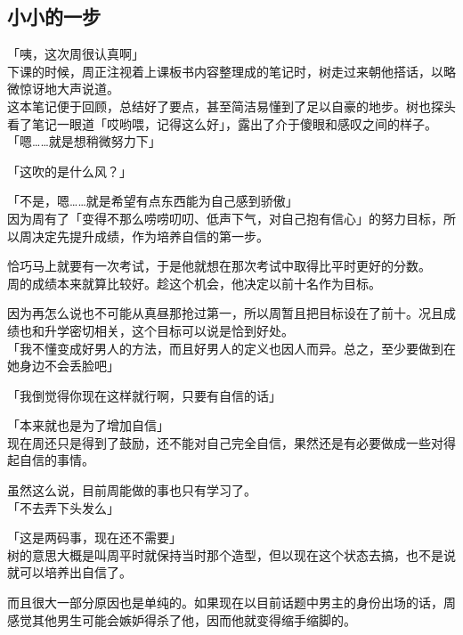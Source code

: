 \subsection{小小的一步}

「咦，这次周很认真啊」\\

下课的时候，周正注视着上课板书内容整理成的笔记时，树走过来朝他搭话，以略微惊讶地大声说道。\\

这本笔记便于回顾，总结好了要点，甚至简洁易懂到了足以自豪的地步。树也探头看了笔记一眼道「哎哟喂，记得这么好」，露出了介于傻眼和感叹之间的样子。\\

「嗯……就是想稍微努力下」

「这吹的是什么风？」

「不是，嗯……就是希望有点东西能为自己感到骄傲」\\

因为周有了「变得不那么唠唠叨叨、低声下气，对自己抱有信心」的努力目标，所以周决定先提升成绩，作为培养自信的第一步。

恰巧马上就要有一次考试，于是他就想在那次考试中取得比平时更好的分数。\\

周的成绩本来就算比较好。趁这个机会，他决定以前十名作为目标。

因为再怎么说也不可能从真昼那抢过第一，所以周暂且把目标设在了前十。况且成绩也和升学密切相关，这个目标可以说是恰到好处。\\

「我不懂变成好男人的方法，而且好男人的定义也因人而异。总之，至少要做到在她身边不会丢脸吧」

「我倒觉得你现在这样就行啊，只要有自信的话」

「本来就也是为了增加自信」\\

现在周还只是得到了鼓励，还不能对自己完全自信，果然还是有必要做成一些对得起自信的事情。

虽然这么说，目前周能做的事也只有学习了。\\

「不去弄下头发么」

「这是两码事，现在还不需要」\\

树的意思大概是叫周平时就保持当时那个造型，但以现在这个状态去搞，也不是说就可以培养出自信了。

而且很大一部分原因也是单纯的。如果现在以目前话题中男主的身份出场的话，周感觉其他男生可能会嫉妒得杀了他，因而他就变得缩手缩脚的。\\


